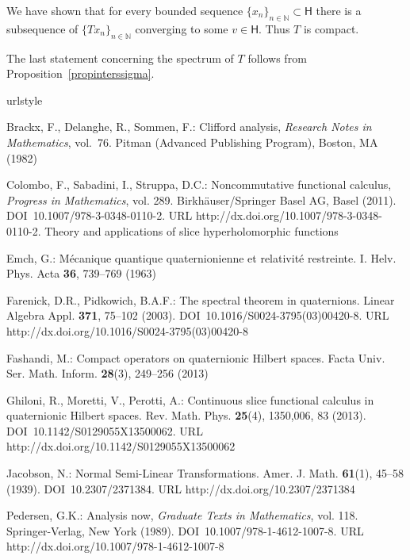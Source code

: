 \documentclass{birkmult}
\theoremstyle{definition}
\theoremstyle{remark}
\numberwithin{equation}{section}
\begin{document}
We have shown that for every bounded sequence $\{x_n\}_{n\in {{\mathbb N}}} \subset {\mathsf{H}}$ there is a subsequence of $\{Tx_n\}_{n\in {{\mathbb N}}}$ converging to some    $v \in {\mathsf{H}}$. Thus $T$ is compact.

The last statement concerning the spectrum of $T$ follows from Proposition~\ref{propinterssigma}. 

\begin{thebibliography}{1}
\providecommand{\url}[1]{{#1}}
\providecommand{\urlprefix}{URL }
\expandafter\ifx\csname urlstyle\endcsname\relax
  \providecommand{\doi}[1]{DOI~\discretionary{}{}{}#1}\else
  \providecommand{\doi}{DOI~\discretionary{}{}{}\begingroup
  \urlstyle{rm}\Url}\fi

Brackx, F., Delanghe, R., Sommen, F.: Clifford analysis, \emph{Research Notes
  in Mathematics}, vol.~76.
\newblock Pitman (Advanced Publishing Program), Boston, MA (1982)

Colombo, F., Sabadini, I., Struppa, D.C.: Noncommutative functional calculus,
  \emph{Progress in Mathematics}, vol. 289.
\newblock Birkh\"auser/Springer Basel AG, Basel (2011).
\newblock \doi{10.1007/978-3-0348-0110-2}.
\newblock \urlprefix\url{http://dx.doi.org/10.1007/978-3-0348-0110-2}.
\newblock Theory and applications of slice hyperholomorphic functions

Emch, G.: M\'ecanique quantique quaternionienne et relativit\'e restreinte.
  {I}.
\newblock Helv. Phys. Acta \textbf{36}, 739--769 (1963)

Farenick, D.R., Pidkowich, B.A.F.: The spectral theorem in quaternions.
\newblock Linear Algebra Appl. \textbf{371}, 75--102 (2003).
\newblock \doi{10.1016/S0024-3795(03)00420-8}.
\newblock \urlprefix\url{http://dx.doi.org/10.1016/S0024-3795(03)00420-8}

Fashandi, M.: Compact operators on quaternionic {H}ilbert spaces.
\newblock Facta Univ. Ser. Math. Inform. \textbf{28}(3), 249--256 (2013)

Ghiloni, R., Moretti, V., Perotti, A.: Continuous slice functional calculus in
  quaternionic {H}ilbert spaces.
\newblock Rev. Math. Phys. \textbf{25}(4), 1350,006, 83 (2013).
\newblock \doi{10.1142/S0129055X13500062}.
\newblock \urlprefix\url{http://dx.doi.org/10.1142/S0129055X13500062}

Jacobson, N.: Normal {S}emi-{L}inear {T}ransformations.
\newblock Amer. J. Math. \textbf{61}(1), 45--58 (1939).
\newblock \doi{10.2307/2371384}.
\newblock \urlprefix\url{http://dx.doi.org/10.2307/2371384}

Pedersen, G.K.: Analysis now, \emph{Graduate Texts in Mathematics}, vol. 118.
\newblock Springer-Verlag, New York (1989).
\newblock \doi{10.1007/978-1-4612-1007-8}.
\newblock \urlprefix\url{http://dx.doi.org/10.1007/978-1-4612-1007-8}

\end{thebibliography}
\end{document}
